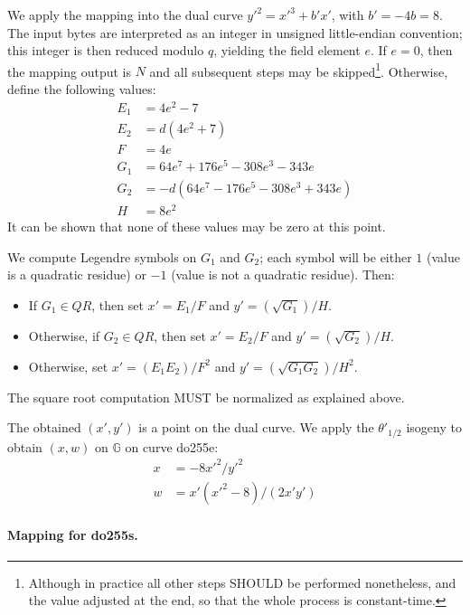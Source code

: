\documentclass{llncs}
\newcommand{\bG}{\mathbb{G}}
\begin{document}
We apply the mapping into the dual curve $y'^2 = x'^3 + b' x'$, with
$b' = -4b = 8$. The input bytes are interpreted as an integer in
unsigned little-endian convention; this integer is then reduced modulo
$q$, yielding the field element $e$. If $e = 0$, then the mapping output
is $N$ and all subsequent steps may be skipped\footnote{Although in
practice all other steps SHOULD be performed nonetheless, and the value
adjusted at the end, so that the whole process is constant-time.}.
Otherwise, define the following values:
\begin{align*}
    E_1 &= 4 e^2 - 7 \\
    E_2 & = d(4 e^2 + 7) \\
    F &= 4 e \\
    G_1 &= 64 e^7 + 176 e^5 - 308 e^3 - 343 e \\
    G_2 &= -d(64 e^7 - 176 e^5 - 308 e^3 + 343 e) \\
    H &= 8 e^2
\end{align*}
It can be shown that none of these values may be zero at this point.

We compute Legendre symbols on $G_1$ and $G_2$; each symbol will be either
$1$ (value is a quadratic residue) or $-1$ (value is not a quadratic
residue). Then:
\begin{itemize}
    \item If $G_1 \in QR$, then set $x' = E_1 / F$ and $y' = (\sqrt{G_1}) / H$.
    \item Otherwise, if $G_2 \in QR$, then set $x' = E_2 / F$ and
    $y' = (\sqrt{G_2}) / H$.
    \item Otherwise, set $x' = (E_1 E_2) / F^2$ and
    $y' = (\sqrt{G_1 G_2}) / H^2$.
\end{itemize}
The square root computation MUST be normalized as explained above.

The obtained $(x', y')$ is a point on the dual curve. We apply the
$\theta'_{1/2}$ isogeny to obtain $(x, w)$ on $\bG$ on curve do255e:
\begin{align*}
    x &= -8 x'^2 / y'^2 \\
    w &= x'(x'^2 - 8) / (2 x' y')
\end{align*}

\paragraph{Mapping for do255s.} 
\end{document}
